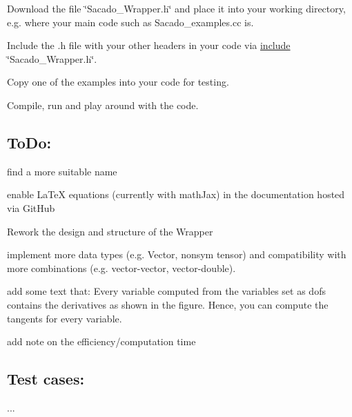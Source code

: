\begin{DoxyEnumerate}
\item Download the file \char`\"{}\+Sacado\+\_\+\+Wrapper.\+h\char`\"{} and place it into your working directory, e.\+g. where your main code such as Sacado\+\_\+examples.\+cc is.
\item Include the .h file with your other headers in your code via \textquotesingle{}\hyperlink{CMakeCache_8txt_a986ccfc90e04633694fe6cff5472be19}{include} \char`\"{}\+Sacado\+\_\+\+Wrapper.\+h\char`\"{}\textquotesingle{}.
\item Copy one of the examples into your code for testing.
\item Compile, run and play around with the code.
\end{DoxyEnumerate}

\subsection*{To\+Do\+:}


\begin{DoxyItemize}
\item find a more suitable name
\item enable La\+TeX equations (currently with math\+Jax) in the documentation hosted via Git\+Hub
\item Rework the design and structure of the Wrapper
\item implement more data types (e.\+g. Vector, nonsym tensor) and compatibility with more combinations (e.\+g. vector-\/vector, vector-\/double).
\item add some text that\+: Every variable computed from the variables set as dofs contains the derivatives as shown in the figure. Hence, you can compute the tangents for every variable.
\item add note on the efficiency/computation time
\end{DoxyItemize}

\subsection*{Test cases\+:}


\begin{DoxyItemize}
\item ... 
\end{DoxyItemize}